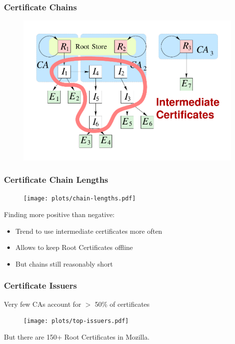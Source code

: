 \begin{frame}
  \frametitle{Certificate Chains}
  \vskip -1.5cm
  \begin{block}{}
    \begin{figure}
      \centering
      \includegraphics[scale=.7]{figures/x509tree-inter.pdf}
    \end{figure}
  \end{block}
\end{frame}




\begin{frame}
  \frametitle{Certificate Chain Lengths}
    \begin{figure}
    \centering
      \texttt{[image: plots/chain-lengths.pdf]}
    \end{figure}
  \begin{block}{Finding more positive than negative:}
    \begin{itemize}
      \item Trend to use intermediate certificates more often
      \item Allows to keep Root Certificates offline
      \item But chains still reasonably short
   \end{itemize}
  \end{block}
\end{frame}

\begin{frame}
  \frametitle{Certificate Issuers}
  \begin{block}{Very few CAs account for $>$ 50\% of certificates}
    \begin{figure}
    \centering
     \texttt{[image: plots/top-issuers.pdf]}
    \end{figure}
  \end{block}
  \begin{block}{But there are 150+ Root Certificates in Mozilla.}\end{block}
\end{frame}
